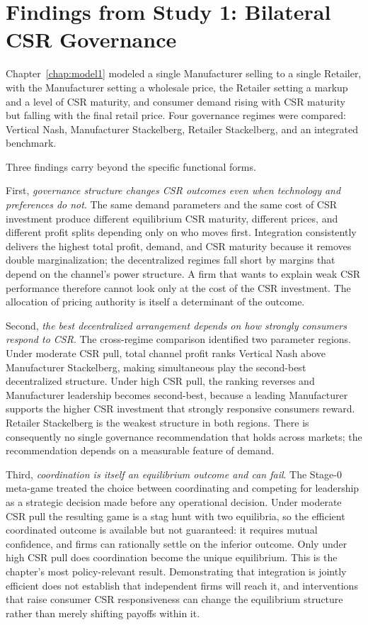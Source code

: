 \section{Findings from Study 1: Bilateral CSR Governance}
\label{sec:ch5_study1}

Chapter~\ref{chap:model1} modeled a single Manufacturer selling to a single Retailer, with the Manufacturer setting a wholesale price, the Retailer setting a markup and a level of CSR maturity, and consumer demand rising with CSR maturity but falling with the final retail price. Four governance regimes were compared: Vertical Nash, Manufacturer Stackelberg, Retailer Stackelberg, and an integrated benchmark.

Three findings carry beyond the specific functional forms.

First, \emph{governance structure changes CSR outcomes even when technology and preferences do not}. The same demand parameters and the same cost of CSR investment produce different equilibrium CSR maturity, different prices, and different profit splits depending only on who moves first. Integration consistently delivers the highest total profit, demand, and CSR maturity because it removes double marginalization; the decentralized regimes fall short by margins that depend on the channel's power structure. A firm that wants to explain weak CSR performance therefore cannot look only at the cost of the CSR investment. The allocation of pricing authority is itself a determinant of the outcome.

Second, \emph{the best decentralized arrangement depends on how strongly consumers respond to CSR}. The cross-regime comparison identified two parameter regions. Under moderate CSR pull, total channel profit ranks Vertical Nash above Manufacturer Stackelberg, making simultaneous play the second-best decentralized structure. Under high CSR pull, the ranking reverses and Manufacturer leadership becomes second-best, because a leading Manufacturer supports the higher CSR investment that strongly responsive consumers reward. Retailer Stackelberg is the weakest structure in both regions. There is consequently no single governance recommendation that holds across markets; the recommendation depends on a measurable feature of demand.

Third, \emph{coordination is itself an equilibrium outcome and can fail}. The Stage-0 meta-game treated the choice between coordinating and competing for leadership as a strategic decision made before any operational decision. Under moderate CSR pull the resulting game is a stag hunt with two equilibria, so the efficient coordinated outcome is available but not guaranteed: it requires mutual confidence, and firms can rationally settle on the inferior outcome. Only under high CSR pull does coordination become the unique equilibrium. This is the chapter's most policy-relevant result. Demonstrating that integration is jointly efficient does not establish that independent firms will reach it, and interventions that raise consumer CSR responsiveness can change the equilibrium structure rather than merely shifting payoffs within it.

